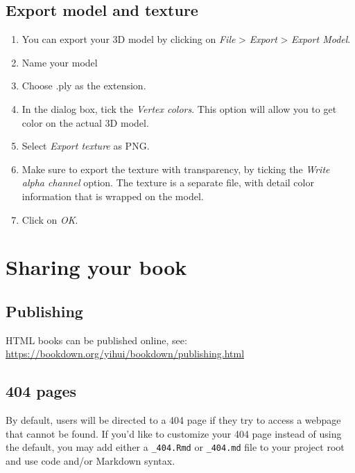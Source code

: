\documentclass[
]{book}
\theoremstyle{definition}
\theoremstyle{definition}
\theoremstyle{definition}
\theoremstyle{definition}
\theoremstyle{remark}
\begin{document}
\hypertarget{export-model-and-texture}{%
\section{Export model and texture}\label{export-model-and-texture}}

\begin{enumerate}
\def\labelenumi{\arabic{enumi}.}
\item
  You can export your 3D model by clicking on \emph{File} \textgreater{} \emph{Export} \textgreater{}
  \emph{Export Model}.
\item
  Name your model
\item
  Choose .ply as the extension.
\item
  In the dialog box, tick the \emph{Vertex colors}. This option will allow
  you to get color on the actual 3D model.
\item
  Select \emph{Export texture} as PNG.
\item
  Make sure to export the texture with transparency, by ticking the
  \emph{Write alpha channel} option. The texture is a separate file, with
  detail color information that is wrapped on the model.
\item
  Click on \emph{OK}.
\end{enumerate}

\hypertarget{sharing-your-book}{%
\chapter{Sharing your book}\label{sharing-your-book}}

\hypertarget{publishing}{%
\section{Publishing}\label{publishing}}

HTML books can be published online, see: \url{https://bookdown.org/yihui/bookdown/publishing.html}

\hypertarget{pages}{%
\section{404 pages}\label{pages}}

By default, users will be directed to a 404 page if they try to access a webpage that cannot be found. If you'd like to customize your 404 page instead of using the default, you may add either a \texttt{\_404.Rmd} or \texttt{\_404.md} file to your project root and use code and/or Markdown syntax.
\end{document}
